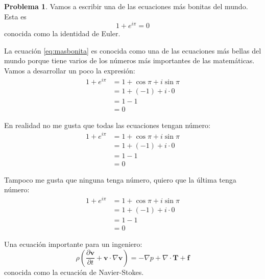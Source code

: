 \documentclass[10pt]{article}
\theoremstyle{definition}
\theoremstyle{remark}
\theoremstyle{definition}
\newtheorem{prob}{Problema}
\newcommand{\pd}[2]{\frac{\partial #1}{ \partial #2}}   %
\renewcommand{\vec}[1]{\boldsymbol{#1}}
\newcommand{\ten}[1]{\boldsymbol{#1}}
\begin{document}
\begin{prob} Vamos a escribir una de las ecuaciones más bonitas del mundo. Esta es 
\begin{equation}
	1 + e^{i\pi} = 0
	\label{eq:masbonita}
\end{equation}
conocida como la identidad de Euler.

La ecuación \eqref{eq:masbonita} es conocida como una de las ecuaciones más bellas del mundo porque tiene varios de los números más importantes de las matemáticas. Vamos a desarrollar un poco la expresión:
\begin{align}
	1+e^{i\pi} & = 1 + \cos \pi + i \sin \pi \\
	& = 1 + (-1) + i \cdot 0 \\
	& = 1 - 1 \\
	& = 0
\end{align}

En realidad no me gusta que todas las ecuaciones tengan número:
\begin{align*}  %
	1+e^{i\pi} & = 1 + \cos \pi + i \sin \pi \\
	& = 1 + (-1) + i \cdot 0 \\
	& = 1 - 1 \\
	& = 0
\end{align*}

Tampoco me gusta que ninguna tenga número, quiero que la última tenga número:
\begin{align}
	1+e^{i\pi} & = 1 + \cos \pi + i \sin \pi \nonumber \\
	& = 1 + (-1) + i \cdot 0 \nonumber \\
	& = 1 - 1 \nonumber \\
	& = 0
\end{align}

Una ecuación importante para un ingeniero:
\begin{equation}
	\rho \left(\pd{\vec{v}}{t} + \vec{v} \cdot \nabla \vec{v} \right) = - \nabla p + \nabla \cdot \ten{T} + \ten f
\label{eq:ns}
\end{equation}
conocida como la ecuación de Navier-Stokes.


\end{prob}
\end{document}
